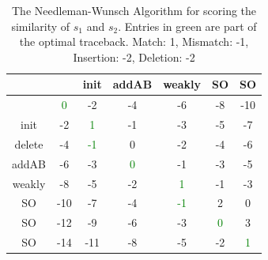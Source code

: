 \documentclass{article}
\begin{document}
\begin{table}
\begin{center}

\begin{tabular}{ c | c c c c c c}
& & init & addAB & weakly  & SO & SO \\ \hline
& \textcolor{green}{0} & -2 & -4 & -6 & -8 & -10 \\

init & -2 & \textcolor{green}{1} & -1 & -3 & -5 & -7 \\

delete & -4 & \textcolor{green}{-1} & 0 & -2 & -4 & -6 \\

addAB& -6 & -3 & \textcolor{green}{0} &-1 &  -3 & -5 \\

weakly& -8 & -5 & -2 & \textcolor{green}{1} & -1 & -3 \\

SO & -10 & -7 &  -4 & \textcolor{green}{-1} & 2 & 0 \\

SO & -12 & -9 & -6 & -3 & \textcolor{green}{0} & 3\\

SO & -14 & -11 & -8 & -5 & -2 & \textcolor{green}{1} 
 
\end{tabular}
\caption{The Needleman-Wunsch Algorithm for scoring the similarity of $s_1$ and $s_2$. Entries in green are part of the optimal traceback. Match: 1, Mismatch: -1, Insertion: -2, Deletion: -2}
\label{tbl:needs1s2}

\end{center}
\end{table}
\end{document}
